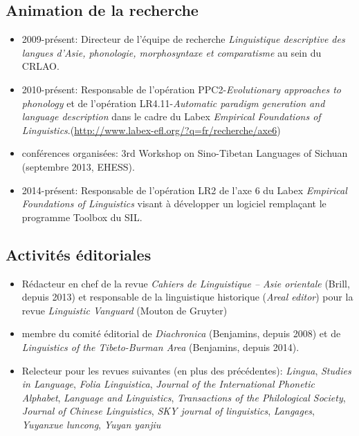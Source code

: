\documentclass[oldfontcommands,oneside,a4paper,11pt]{article}
\begin{document}
\subsection{Animation de la recherche}
\begin{itemize}
\item 2009-présent: Directeur de l'équipe de recherche \textit{Linguistique descriptive des langues d’Asie, phonologie, morphosyntaxe et comparatisme} au sein du CRLAO.
\item 2010-présent: Responsable de l'opération PPC2-\textit{Evolutionary approaches to phonology} et de l'opération LR4.11-\textit{Automatic paradigm generation and language description} dans le cadre du Labex \textit{Empirical Foundations of Linguistics}.(\url{http://www.labex-efl.org/?q=fr/recherche/axe6})
\item conférences organisées:  3rd Workshop on Sino-Tibetan Languages of Sichuan (septembre 2013, EHESS).
\item  2014-présent: Responsable de l'opération LR2 de l'axe 6 du Labex \textit{Empirical Foundations of Linguistics} visant à développer un logiciel remplaçant le programme Toolbox du SIL.
\end{itemize}


\subsection{Activités éditoriales}
\begin{itemize}
\item Rédacteur en chef de la revue \textit{Cahiers de Linguistique -- Asie orientale} (Brill, depuis 2013) et responsable de la linguistique historique (\textit{Areal editor}) pour la revue \textit{Linguistic Vanguard} (Mouton de Gruyter)
\item membre du comité éditorial de \textit{Diachronica} (Benjamins, depuis 2008) et de \textit{Linguistics of the Tibeto-Burman Area}  (Benjamins, depuis 2014).
\item Relecteur pour les revues suivantes (en plus des précédentes): \textit{Lingua}, \textit{Studies in Language}, \textit{Folia Linguistica}, \textit{Journal of the International Phonetic Alphabet},  \textit{Language and Linguistics}, \textit{Transactions of the Philological Society}, \textit{Journal of Chinese Linguistics}, \textit{SKY journal of linguistics}, \textit{Langages}, \textit{Yuyanxue luncong}, \textit{Yuyan yanjiu}
\end{itemize}
\end{document}
